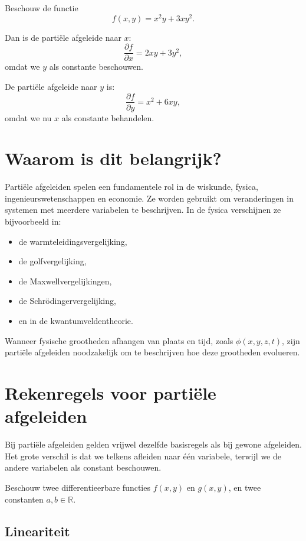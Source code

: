 \documentclass[11pt,a4paper]{article}
\begin{document}
    Beschouw de functie
    \[
        f(x,y) = x^2y + 3xy^2.
    \]

    Dan is de partiële afgeleide naar \( x \):
    \[
        \frac{\partial f}{\partial x} = 2xy + 3y^2,
    \]
    omdat we \( y \) als constante beschouwen.

    De partiële afgeleide naar \( y \) is:
    \[
        \frac{\partial f}{\partial y} = x^2 + 6xy,
    \]
    omdat we nu \( x \) als constante behandelen.


    \section{Waarom is dit belangrijk?}

    Partiële afgeleiden spelen een fundamentele rol in de wiskunde, fysica, ingenieurswetenschappen en economie. Ze worden gebruikt om veranderingen in systemen met meerdere variabelen te beschrijven. In de fysica verschijnen ze bijvoorbeeld in:

    \begin{itemize}
        \item de warmteleidingsvergelijking,
        \item de golfvergelijking,
        \item de Maxwellvergelijkingen,
        \item de Schrödingervergelijking,
        \item en in de kwantumveldentheorie.
    \end{itemize}

    Wanneer fysische grootheden afhangen van plaats en tijd, zoals \( \phi(x,y,z,t) \), zijn partiële afgeleiden noodzakelijk om te beschrijven hoe deze grootheden evolueren.


    \section{Rekenregels voor partiële afgeleiden}

    Bij partiële afgeleiden gelden vrijwel dezelfde basisregels als bij gewone afgeleiden.
    Het grote verschil is dat we telkens afleiden naar \'{e}\'en variabele, terwijl we de
    andere variabelen als constant beschouwen.

    Beschouw twee differentieerbare functies $f(x,y)$ en $g(x,y)$, en twee constanten
    $a,b \in \mathbb{R}$.

    \subsection{Lineariteit}
\end{document}
